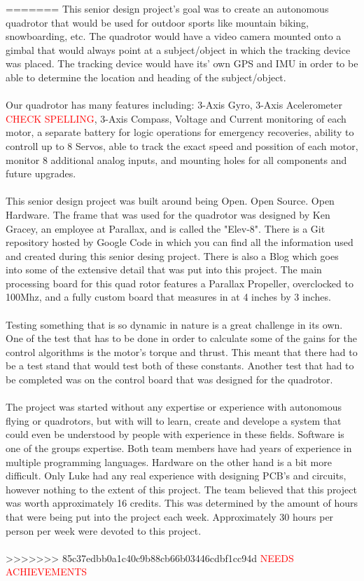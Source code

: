 \documentclass{article}
\numberwithin{equation}{section} %
\begin{document}
=======
This senior design project's goal was to create an autonomous quadrotor that would be used for outdoor sports like mountain biking, snowboarding, etc. The quadrotor would have a video camera mounted onto a gimbal that would always point at a subject/object in which the tracking device was placed. The tracking device would have its' own GPS and IMU in order to be able to determine the location and heading of the subject/object.\\ \\
Our quadrotor has many features including: 3-Axis Gyro, 3-Axis Acelerometer \textcolor{red}{CHECK SPELLING}, 3-Axis Compass, Voltage and Current monitoring of each motor, a separate battery for logic operations for emergency recoveries, ability to controll up to 8 Servos, able to track the exact speed and possition of each motor, monitor 8 additional analog inputs, and mounting holes for all components and future upgrades. \\ \\
This senior design project was built around being Open. Open Source. Open Hardware. The frame that was used for the quadrotor was designed by Ken Gracey, an employee at Parallax, and is called the "Elev-8". There is a Git repository hosted by Google Code in which you can find all the information used and created during this senior desing project. There is also a Blog which goes into some of the extensive detail that was put into this project. The main processing board for this quad rotor features a Parallax Propeller, overclocked to 100Mhz, and a fully custom board that measures in at 4 inches by 3 inches. \\ \\
Testing something that is so dynamic in nature is a great challenge in its own. One of the test that has to be done in order to calculate some of the gains for the control algorithms is the motor's torque and thrust. This meant that there had to be a test stand that would test both of these constants. Another test that had to be completed was on the control board that was designed for the quadrotor. \\ \\
The project was started without any expertise or experience with autonomous flying or quadrotors, but with will to learn, create and develope a system that could even be understood by people with experience in these fields. Software is one of the groups expertise. Both team members have had years of experience in multiple programming languages. Hardware on the other hand is a bit more difficult. Only Luke had any real experience with designing PCB's and circuits, however nothing to the extent of this project. The team believed that this project was worth approximately 16 credits. This was determined by the amount of hours that were being put into the project each week. Approximately 30 hours per person per week were devoted to this project. \\ \\
>>>>>>> 85c37edbb0a1c40c9b88cb66b03446cdbf1cc94d
\textcolor{red}{NEEDS ACHIEVEMENTS}
\end{document}
